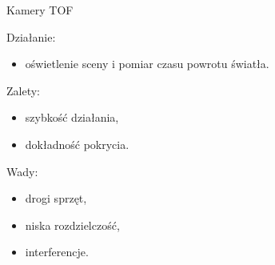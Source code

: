 \documentclass[xcolor=x11names,compress]{beamer}
\renewcommand{\(}{\begin{columns}}
\renewcommand{\)}{\end{columns}}
\newcommand{\<}[1]{\begin{column}{#1}}
\renewcommand{\>}{\end{column}}
\begin{document}
\begin{frame}{Kamery TOF}

\alert{Działanie:}
\begin{itemize}
\item oświetlenie sceny i pomiar czasu powrotu światła.
\end{itemize}

\vspace{.4cm}

\alert{Zalety:}
\begin{itemize}
\item szybkość działania,
\item dokładność pokrycia.
\end{itemize}

\vspace{.4cm}

\alert{Wady:}
\begin{itemize}
\item drogi sprzęt,
\item niska rozdzielczość,
\item interferencje.
\end{itemize}

\end{frame}
\end{document}
